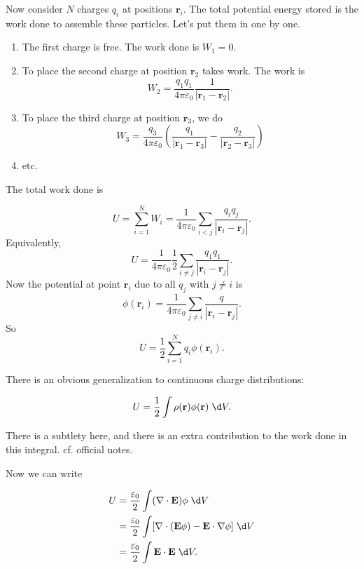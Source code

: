 \documentclass[a4paper]{article}
\begin{document}
Now consider $N$ charges $q_i$ at positions $\mathbf{r}_i$. The total potential energy stored is the work done to assemble these particles. Let's put them in one by one.
\begin{enumerate}
  \item The first charge is free. The work done is $W_1 = 0$.
  \item To place the second charge at position $\mathbf{r}_2$ takes work. The work is
    \[
      W_2 = \frac{q_1q_1}{4\pi\varepsilon_0}\frac{1}{|\mathbf{r}_1 - \mathbf{r}_2|}.
    \]
  \item To place the third charge at position $\mathbf{r}_3$, we do
    \[
      W_3 = \frac{q_3}{4\pi\varepsilon_0}\left(\frac{q_1}{|\mathbf{r}_1 - \mathbf{r}_3|} - \frac{q_2}{|\mathbf{r}_2 - \mathbf{r}_3|}\right)
    \]
  \item etc.
\end{enumerate}
The total work done is
\begin{prop}
  \[
    U = \sum_{i = 1}^N W_i = \frac{1}{4\pi\varepsilon_0} \sum_{i < j} \frac{q_iq_j}{|\mathbf{r}_i - \mathbf{r}_j|}.
  \]
  Equivalently, 
  \[
    U = \frac{1}{4\pi\varepsilon_0} \frac{1}{2} \sum_{i \not= j} \frac{q_1q_1}{|\mathbf{r}_i - \mathbf{r}_j|}.
  \]
  Now the potential at point $\mathbf{r}_i$ due to all $q_j$ with $j\not= i$ is
  \[
    \phi(\mathbf{r}_i) = \frac{1}{4\pi\varepsilon_0}\sum_{j\not= i}\frac{q}{|\mathbf{r}_i - \mathbf{r}_j|}.
  \]
  So
  \[
    U = \frac{1}{2}\sum_{i = 1}^N q_i \phi(\mathbf{r}_i).
  \]
\end{prop}
There is an obvious generalization to continuous charge distributions:
\begin{prop}
  \[
    U = \frac{1}{2} \int \rho (\mathbf{r}) \phi(\mathbf{r}) \;\d V.
  \]
\end{prop}
\note There is a subtlety here, and there is an extra contribution to the work done in this integral. cf. official notes.

Now we can write
\begin{prop}
  \begin{align*}
    U &= \frac{\varepsilon_0}{2}\int (\nabla\cdot \mathbf{E}) \phi \;\d V\\
    &= \frac{\varepsilon_0}{2}\int [\nabla\cdot (\mathbf{E}\phi) - \mathbf{E}\cdot \nabla \phi]\;\d V\\
    &= \frac{\varepsilon_0}{2}\int \mathbf{E}\cdot \mathbf{E} \;\d V.
  \end{align*}
\end{prop}
\end{document}
